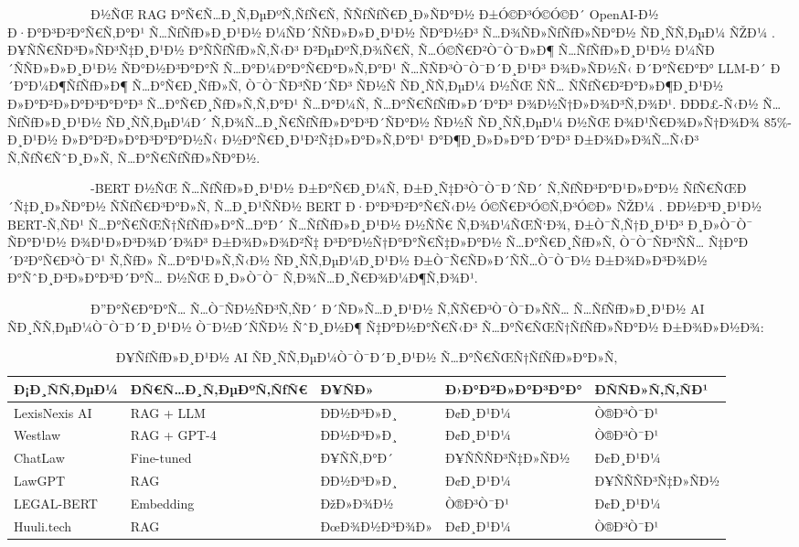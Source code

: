 \documentclass[12pt,A4]{report}
\begin{document}
\ \ \ \ \ \ \ \ \  \ \ \ \ \LawGPT Ð½ÑŒ RAG Ð°Ñ€Ñ…Ð¸Ñ‚ÐµÐºÑ‚ÑƒÑ€Ñ‚ ÑÑƒÑƒÑ€Ð¸Ð»ÑÐ°Ð½
Ð±Ó©Ð³Ó©Ó©Ð´ OpenAI-Ð½ Ð·Ð°Ð³Ð²Ð°Ñ€Ñ‚Ð°Ð¹ Ñ…ÑƒÑƒÐ»Ð¸Ð¹Ð½ Ð¼ÑÐ´ÑÑÐ»Ð»Ð¸Ð¹Ð½ ÑÐ°Ð½Ð³ Ñ…Ð¾ÑÐ»ÑƒÑƒÐ»ÑÐ°Ð½ ÑÐ¸ÑÑ‚ÐµÐ¼ ÑŽÐ¼
\cite{lawgpt2023}. Ð¥ÑÑ€ÑÐ³Ð»ÑÐ³Ñ‡Ð¸Ð¹Ð½ Ð°ÑÑƒÑƒÐ»Ñ‚Ñ‹Ð³ Ð²ÐµÐºÑ‚Ð¾Ñ€Ñ‚ Ñ…Ó©Ñ€Ð²Ò¯Ò¯Ð»Ð¶ Ñ…ÑƒÑƒÐ»Ð¸Ð¹Ð½
Ð¼ÑÐ´ÑÑÐ»Ð»Ð¸Ð¹Ð½ ÑÐ°Ð½Ð³Ð°Ð°Ñ Ñ…Ð°Ð¼Ð°Ð°Ñ€Ð°Ð»Ñ‚Ð°Ð¹ Ñ…ÑÑÐ³Ò¯Ò¯Ð´Ð¸Ð¹Ð³ Ð¾Ð»ÑÐ½Ñ‹ Ð´Ð°Ñ€Ð°Ð° LLM-Ð´ Ð´Ð°Ð¼Ð¶ÑƒÑƒÐ»Ð¶
Ñ…Ð°Ñ€Ð¸ÑƒÐ»Ñ‚ Ò¯Ò¯ÑÐ³ÑÐ´ÑÐ³ ÑÐ½Ñ ÑÐ¸ÑÑ‚ÐµÐ¼ Ð½ÑŒ ÑÑ… ÑÑƒÑ€Ð²Ð°Ð»Ð¶Ð¸Ð¹Ð½ Ð»Ð°Ð²Ð»Ð°Ð³Ð°Ð°Ð³ Ñ…Ð°Ñ€Ð¸ÑƒÐ»Ñ‚Ñ‚Ð°Ð¹ Ñ…Ð°Ð¼Ñ‚
Ñ…Ð°Ñ€ÑƒÑƒÐ»Ð´Ð°Ð³ Ð¾Ð½Ñ†Ð»Ð¾Ð³Ñ‚Ð¾Ð¹. ÐÐÐ£-Ñ‹Ð½ Ñ…ÑƒÑƒÐ»Ð¸Ð¹Ð½ ÑÐ¸ÑÑ‚ÐµÐ¼Ð´ Ñ‚Ð¾Ñ…Ð¸Ñ€ÑƒÑƒÐ»Ð°Ð³Ð´ÑÐ°Ð½ ÑÐ½Ñ ÑÐ¸ÑÑ‚ÐµÐ¼
Ð½ÑŒ Ð¾Ð¹Ñ€Ð¾Ð»Ñ†Ð¾Ð¾ 85\%-Ð¸Ð¹Ð½ Ð»Ð°Ð²Ð»Ð°Ð³Ð°Ð°Ð½Ñ‹ Ð½Ð°Ñ€Ð¸Ð¹Ð²Ñ‡Ð»Ð°Ð»Ñ‚Ð°Ð¹ Ð°Ð¶Ð¸Ð»Ð»Ð°Ð´Ð°Ð³ Ð±Ð¾Ð»Ð¾Ñ…Ñ‹Ð³
Ñ‚ÑƒÑ€ÑˆÐ¸Ð»Ñ‚ Ñ…Ð°Ñ€ÑƒÑƒÐ»ÑÐ°Ð½.

\ \ \ \ \ \ \ \ \  \ \ \ \ \LEGAL-BERT Ð½ÑŒ Ñ…ÑƒÑƒÐ»Ð¸Ð¹Ð½ Ð±Ð°Ñ€Ð¸Ð¼Ñ‚
Ð±Ð¸Ñ‡Ð³Ò¯Ò¯Ð´ÑÐ´ Ñ‚ÑƒÑÐ³Ð°Ð¹Ð»Ð°Ð½ ÑƒÑ€ÑŒÐ´Ñ‡Ð¸Ð»ÑÐ°Ð½ ÑÑƒÑ€Ð³Ð°Ð»Ñ‚ Ñ…Ð¸Ð¹ÑÑÐ½ BERT Ð·Ð°Ð³Ð²Ð°Ñ€Ñ‹Ð½ Ó©Ñ€Ð³Ó©Ñ‚Ð³Ó©Ð»
ÑŽÐ¼ \cite{chalkidis2020legal}. Ð­Ð½Ð³Ð¸Ð¹Ð½ BERT-Ñ‚ÑÐ¹ Ñ…Ð°Ñ€ÑŒÑ†ÑƒÑƒÐ»Ð°Ñ…Ð°Ð´ Ñ…ÑƒÑƒÐ»Ð¸Ð¹Ð½
Ð½ÑÑ€ Ñ‚Ð¾Ð¼ÑŒÑ‘Ð¾, Ð±Ò¯Ñ‚Ñ†Ð¸Ð¹Ð³ Ð¸Ð»Ò¯Ò¯ ÑÐ°Ð¹Ð½ Ð¾Ð¹Ð»Ð³Ð¾Ð´Ð¾Ð³ Ð±Ð¾Ð»Ð¾Ð²Ñ‡ Ð³Ð°Ð½Ñ†Ð°Ð°Ñ€Ñ‡Ð»Ð°Ð½ Ñ…Ð°Ñ€Ð¸ÑƒÐ»Ñ‚
Ò¯Ò¯ÑÐ³ÑÑ… Ñ‡Ð°Ð´Ð²Ð°Ñ€Ð³Ò¯Ð¹ Ñ‚ÑƒÐ» Ñ…Ð°Ð¹Ð»Ñ‚Ñ‹Ð½ ÑÐ¸ÑÑ‚ÐµÐ¼Ð¸Ð¹Ð½ Ð±Ò¯Ñ€ÑÐ»Ð´ÑÑ…Ò¯Ò¯Ð½ Ð±Ð¾Ð»Ð³Ð¾Ð½ Ð°ÑˆÐ¸Ð³Ð»Ð°Ð³Ð´Ð°Ñ…
Ð½ÑŒ Ð¸Ð»Ò¯Ò¯ Ñ‚Ð¾Ñ…Ð¸Ñ€Ð¾Ð¼Ð¶Ñ‚Ð¾Ð¹.

\ \ \ \ \ \ \ \ \  \ \ \ \ Ð”Ð°Ñ€Ð°Ð°Ñ… Ñ…Ò¯ÑÐ½ÑÐ³Ñ‚ÑÐ´ Ð´ÑÐ»Ñ…Ð¸Ð¹Ð½ Ñ‚ÑÑ€Ð³Ò¯Ò¯Ð»ÑÑ… Ñ…ÑƒÑƒÐ»Ð¸Ð¹Ð½
AI ÑÐ¸ÑÑ‚ÐµÐ¼Ò¯Ò¯Ð´Ð¸Ð¹Ð½ Ò¯Ð½Ð´ÑÑÐ½ ÑˆÐ¸Ð½Ð¶ Ñ‡Ð°Ð½Ð°Ñ€Ñ‹Ð³ Ñ…Ð°Ñ€ÑŒÑ†ÑƒÑƒÐ»ÑÐ°Ð½ Ð±Ð¾Ð»Ð½Ð¾:

\begin{table}[h]
\centering
\caption{Ð¥ÑƒÑƒÐ»Ð¸Ð¹Ð½ AI ÑÐ¸ÑÑ‚ÐµÐ¼Ò¯Ò¯Ð´Ð¸Ð¹Ð½ Ñ…Ð°Ñ€ÑŒÑ†ÑƒÑƒÐ»Ð°Ð»Ñ‚}
\begin{tabular}{|l|l|l|l|l|}
\hline
\textbf{Ð¡Ð¸ÑÑ‚ÐµÐ¼} & \textbf{ÐÑ€Ñ…Ð¸Ñ‚ÐµÐºÑ‚ÑƒÑ€} & \textbf{Ð¥ÑÐ»} &
\textbf{Ð›Ð°Ð²Ð»Ð°Ð³Ð°Ð°} & \textbf{ÐÑÑÐ»Ñ‚Ñ‚ÑÐ¹} \\
\hline
LexisNexis AI  & RAG + LLM   & ÐÐ½Ð³Ð»Ð¸   & Ð¢Ð¸Ð¹Ð¼         & Ò®Ð³Ò¯Ð¹ \\
Westlaw        & RAG + GPT-4 & ÐÐ½Ð³Ð»Ð¸   & Ð¢Ð¸Ð¹Ð¼         & Ò®Ð³Ò¯Ð¹ \\
ChatLaw        & Fine-tuned  & Ð¥ÑÑ‚Ð°Ð´   & Ð¥ÑÑÑÐ³Ñ‡Ð»ÑÐ½    & Ð¢Ð¸Ð¹Ð¼ \\
LawGPT         & RAG         & ÐÐ½Ð³Ð»Ð¸   & Ð¢Ð¸Ð¹Ð¼         & Ð¥ÑÑÑÐ³Ñ‡Ð»ÑÐ½ \\
LEGAL-BERT     & Embedding   & ÐžÐ»Ð¾Ð½    & Ò®Ð³Ò¯Ð¹         & Ð¢Ð¸Ð¹Ð¼ \\
Huuli.tech     & RAG         & ÐœÐ¾Ð½Ð³Ð¾Ð»  & Ð¢Ð¸Ð¹Ð¼         & Ò®Ð³Ò¯Ð¹ \\
\hline
\end{tabular}
\label{tab:legal_ai_comparison}
\end{table}
\end{document}
